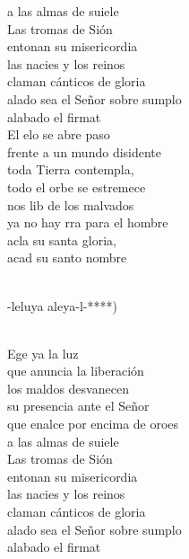 \documentclass[12pt]{article}
\begin{document}
\begin{multicols*}{2}
\begin{cancion}
	a las almas de suiele\\
\jump
	Las tromas de Sión \\
entonan su misericordia\\
	las nacies y los reinos \\
claman cánticos de gloria\\
	alado sea el Señor sobre sumplo\\
	alabado el firmat\\
\jump
	El elo se abre paso \\
frente a un mundo disidente\\
	toda  Tierra contempla, \\
todo el orbe se estremece\\
	nos lib de los malvados  \\
	ya no hay rra para el hombre\\
	acla su santa gloria,\\
	 acad su santo nombre\\\jump\\
	\begin{chorus}%
	-leluya aleya-l-*)\\
	\end{chorus}%
	\jump\\
	Ege ya la luz \\
que anuncia la liberación\\
	los maldos desvanecen \\
su presencia ante el Señor\\
	que enalce por encima de oroes\\
	a las almas de suiele\\
\jump
	Las tromas de Sión \\
entonan su misericordia\\
	las nacies y los reinos \\
claman cánticos de gloria\\
	alado sea el Señor sobre sumplo\\
	alabado el firmat\\

\end{cancion}
\end{multicols*}
\end{document}
